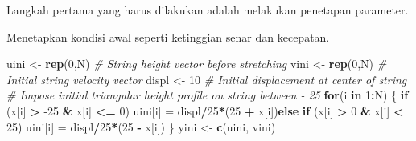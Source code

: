 \documentclass[]{book}
\newenvironment{Shaded}{\begin{snugshade}}{\end{snugshade}}
\newcommand{\CommentTok}[1]{\textcolor[rgb]{0.56,0.35,0.01}{\textit{#1}}}
\newcommand{\ControlFlowTok}[1]{\textcolor[rgb]{0.13,0.29,0.53}{\textbf{#1}}}
\newcommand{\DataTypeTok}[1]{\textcolor[rgb]{0.13,0.29,0.53}{#1}}
\newcommand{\DecValTok}[1]{\textcolor[rgb]{0.00,0.00,0.81}{#1}}
\newcommand{\FloatTok}[1]{\textcolor[rgb]{0.00,0.00,0.81}{#1}}
\newcommand{\KeywordTok}[1]{\textcolor[rgb]{0.13,0.29,0.53}{\textbf{#1}}}
\newcommand{\NormalTok}[1]{#1}
\newcommand{\OperatorTok}[1]{\textcolor[rgb]{0.81,0.36,0.00}{\textbf{#1}}}
\newcommand{\StringTok}[1]{\textcolor[rgb]{0.31,0.60,0.02}{#1}}
\theoremstyle{definition}
\theoremstyle{definition}
\theoremstyle{definition}
\theoremstyle{remark}
\begin{document}
Langkah pertama yang harus dilakukan adalah melakukan penetapan parameter.

\begin{Shaded}
\end{Shaded}

Menetapkan kondisi awal seperti ketinggian senar dan kecepatan.

\begin{Shaded}
\begin{Highlighting}[]
\NormalTok{uini  <-}\StringTok{ }\KeywordTok{rep}\NormalTok{(}\DecValTok{0}\NormalTok{,N) }\CommentTok{# String height vector before stretching}
\NormalTok{vini  <-}\StringTok{ }\KeywordTok{rep}\NormalTok{(}\DecValTok{0}\NormalTok{,N) }\CommentTok{# Initial string velocity vector}
\NormalTok{displ <-}\StringTok{ }\DecValTok{10}       \CommentTok{# Initial displacement at center of string}
\CommentTok{# Impose initial triangular height profile on string between - 25}
\ControlFlowTok{for}\NormalTok{(i }\ControlFlowTok{in} \DecValTok{1}\OperatorTok{:}\NormalTok{N) \{}
  \ControlFlowTok{if}\NormalTok{ (x[i] }\OperatorTok{>}\StringTok{ }\DecValTok{-25} \OperatorTok{&}\StringTok{ }\NormalTok{x[i] }\OperatorTok{<=}\StringTok{ }\DecValTok{0}\NormalTok{) uini[i] =}\StringTok{ }\NormalTok{displ}\OperatorTok{/}\DecValTok{25}\OperatorTok{*}\NormalTok{(}\DecValTok{25} \OperatorTok{+}\StringTok{ }\NormalTok{x[i])}\ControlFlowTok{else}
  \ControlFlowTok{if}\NormalTok{ (x[i] }\OperatorTok{>}\StringTok{ }\DecValTok{0} \OperatorTok{&}\StringTok{ }\NormalTok{x[i] }\OperatorTok{<}\StringTok{ }\DecValTok{25}\NormalTok{) uini[i] =}\StringTok{ }\NormalTok{displ}\OperatorTok{/}\DecValTok{25}\OperatorTok{*}\NormalTok{(}\DecValTok{25} \OperatorTok{-}\StringTok{ }\NormalTok{x[i])}
\NormalTok{\}}
\NormalTok{yini  <-}\StringTok{ }\KeywordTok{c}\NormalTok{(uini, vini)}
\end{Highlighting}
\end{Shaded}
\end{document}
